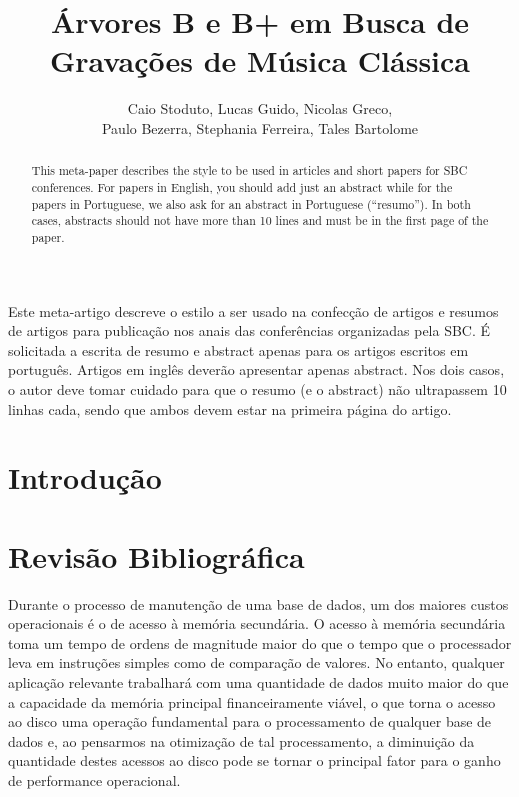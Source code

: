 \documentclass[12pt]{article}
\title{Árvores B e B\nolinebreak+ em Busca de Gravações de Música Clássica\\}
\author{Caio Stoduto\inst{1}, Lucas Guido\inst{1}, Nicolas Greco\inst{1},\\
Paulo Bezerra\inst{1}, Stephania Ferreira\inst{1}, Tales Bartolome\inst{1}}
\begin{document}
 

\maketitle

\begin{abstract}
  This meta-paper describes the style to be used in articles and short papers
  for SBC conferences. For papers in English, you should add just an abstract
  while for the papers in Portuguese, we also ask for an abstract in Portuguese
  (``resumo''). In both cases, abstracts should not have more than 10 lines and
  must be in the first page of the paper.
\end{abstract}
     
\begin{resumo} 
  Este meta-artigo descreve o estilo a ser usado na confecção de artigos e
  resumos de artigos para publicação nos anais das conferências organizadas pela
  SBC. É solicitada a escrita de resumo e abstract apenas para os artigos
  escritos em português. Artigos em inglês deverão apresentar apenas abstract.
  Nos dois casos, o autor deve tomar cuidado para que o resumo (e o abstract)
  não ultrapassem 10 linhas cada, sendo que ambos devem estar na primeira página
  do artigo.
\end{resumo}


\section{Introdução} 



\section{Revisão Bibliográfica} \label{sec:revisao}

Durante o processo de manutenção de uma base de dados, um dos maiores custos
operacionais é o de acesso à memória secundária. O acesso à memória secundária
toma um tempo de ordens de magnitude maior do que o tempo que o processador leva
em instruções simples como de comparação de valores. No entanto, qualquer
aplicação relevante trabalhará com uma quantidade de dados muito maior do que a
capacidade da memória principal financeiramente viável, o que torna o acesso ao
disco uma operação fundamental para o processamento de qualquer base de dados e,
ao pensarmos na otimização de tal processamento, a diminuição da quantidade
destes acessos ao disco pode se tornar o principal fator para o ganho de
performance operacional.
\end{document}
